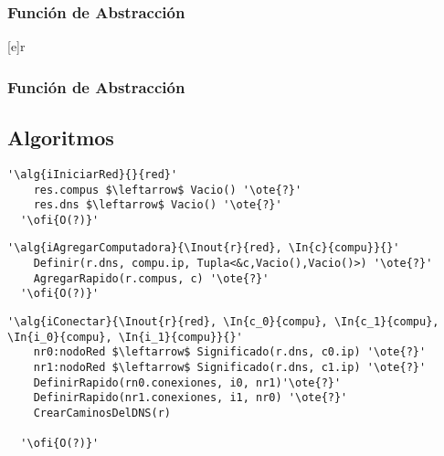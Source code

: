   \subsubsection{Función de Abstracción}

   [e]{r}{
    }
\subsubsection{Función de Abstracción}




\subsection{Algoritmos}
\lstset{style=alg}
\begin{lstlisting}[mathescape]
  '\alg{iIniciarRed}{}{red}'
    res.compus $\leftarrow$ Vacio() '\ote{?}'
    res.dns $\leftarrow$ Vacio() '\ote{?}'
  '\ofi{O(?)}'
\end{lstlisting}

\begin{lstlisting}[mathescape]
  '\alg{iAgregarComputadora}{\Inout{r}{red}, \In{c}{compu}}{}'
    Definir(r.dns, compu.ip, Tupla<&c,Vacio(),Vacio()>) '\ote{?}'
    AgregarRapido(r.compus, c) '\ote{?}'
  '\ofi{O(?)}'
\end{lstlisting}


\begin{lstlisting}[mathescape]
  '\alg{iConectar}{\Inout{r}{red}, \In{c_0}{compu}, \In{c_1}{compu}, \In{i_0}{compu}, \In{i_1}{compu}}{}'
    nr0:nodoRed $\leftarrow$ Significado(r.dns, c0.ip) '\ote{?}'
    nr1:nodoRed $\leftarrow$ Significado(r.dns, c1.ip) '\ote{?}'
    DefinirRapido(rn0.conexiones, i0, nr1)'\ote{?}'
    DefinirRapido(nr1.conexiones, i1, nr0) '\ote{?}'
    CrearCaminosDelDNS(r)

  '\ofi{O(?)}'
\end{lstlisting}

